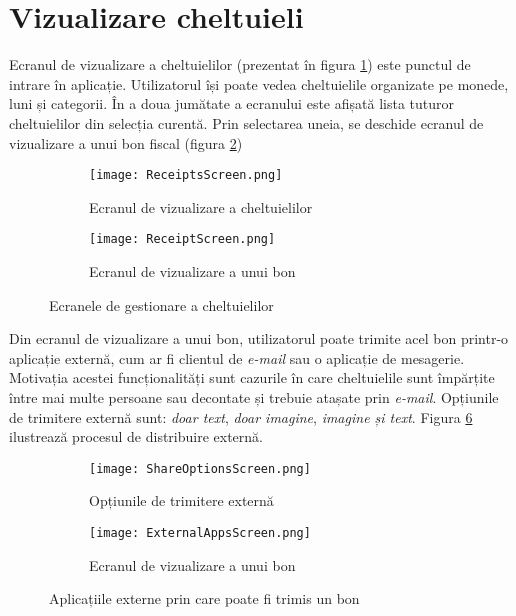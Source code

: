 \section{Vizualizare cheltuieli}\label{spec:receipts}

Ecranul de vizualizare a cheltuielilor (prezentat în figura \ref{fig:receipts}) este punctul de intrare în aplicație. Utilizatorul își poate vedea cheltuielile organizate pe monede, luni și categorii. În a doua jumătate a ecranului este afișată lista tuturor cheltuielilor din selecția curentă. Prin selectarea uneia, se deschide ecranul de vizualizare a unui bon fiscal (figura \ref{fig:receipt})

\begin{figure}[!ht]
  \centering
  \begin{subfigure}{0.49\textwidth}
    \centering
    \texttt{[image: ReceiptsScreen.png]}
    \caption{Ecranul de vizualizare a cheltuielilor}
    \label{fig:receipts}
  \end{subfigure}
  \begin{subfigure}{0.49\textwidth}
    \centering
    \texttt{[image: ReceiptScreen.png]}
    \caption{Ecranul de vizualizare a unui bon}
    \label{fig:receipt}
  \end{subfigure}
  \caption{Ecranele de gestionare a cheltuielilor}
  \label{fig:manageReceipts}
\end{figure}

Din ecranul de vizualizare a unui bon, utilizatorul poate trimite acel bon printr-o aplicație externă, cum ar fi clientul de \emph{e-mail} sau o aplicație de mesagerie. Motivația acestei funcționalități sunt cazurile în care cheltuielile sunt împărțite între mai multe persoane sau decontate și trebuie atașate prin \emph{e-mail}. Opțiunile de trimitere externă sunt: \emph{doar text}, \emph{doar imagine}, \emph{imagine și text}. Figura \ref{fig:sharingFlow} ilustrează procesul de distribuire externă.

\begin{figure}[!ht]
  \centering
  \begin{subfigure}{0.49\textwidth}
    \centering
    \texttt{[image: ShareOptionsScreen.png]}
    \caption{Opțiunile de trimitere externă}
    \label{fig:sharingOptions}
  \end{subfigure}
  \begin{subfigure}{0.49\textwidth}
    \centering
    \texttt{[image: ExternalAppsScreen.png]}
    \caption{Ecranul de vizualizare a unui bon}
    \label{fig:externalApps}
  \end{subfigure}
  \caption{Aplicațiile externe prin care poate fi trimis un bon}
  \label{fig:sharingFlow}
\end{figure}

